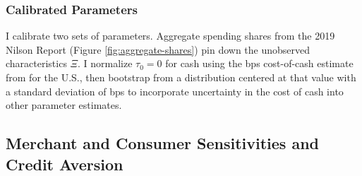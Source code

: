 \documentclass[main.tex]{subfiles}
\begin{document}
\subsubsection{Calibrated Parameters}

I calibrate two sets of parameters.
Aggregate spending shares from the 2019 Nilson Report (Figure \ref{fig:aggregate-shares}) pin down the unobserved characteristics $\Xi$.
I normalize $\tau_0 = 0$ for cash using the  bps cost-of-cash estimate from \textcite{Felt.etal2020} for the U.S., then bootstrap from a distribution centered at that value with a standard deviation of  bps to incorporate uncertainty in the cost of cash into other parameter estimates.

\subsection{Merchant and Consumer Sensitivities and Credit Aversion}
\end{document}
